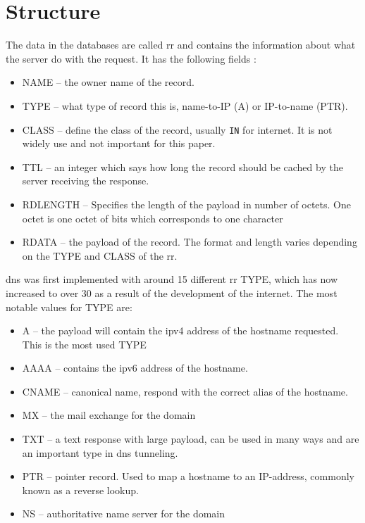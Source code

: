 \section{Structure}
The data in the databases are called \gls{rr} and contains the information about what the server do with the request. It has the following fields \cite{mockapetris1983domain}:
\begin{itemize} 
\item NAME -- the owner name of the record.
\item TYPE -- what type of record this is, name-to-IP (A) or IP-to-name (PTR).
\item CLASS -- define the class of the record, usually \texttt{IN} for internet. It is not widely use and not important for this paper.
\item TTL -- an integer which says how long the record should be cached by the server receiving the response.
\item RDLENGTH -- Specifies the length of the payload in number of octets. One octet is one octet of bits which corresponds to one character
\item RDATA -- the payload of the record. The format and length varies depending on the TYPE and CLASS of the \Gls{rr}.
\end{itemize}

\gls{dns} was first implemented with around 15 different \gls{rr} TYPE, which has now increased to over 30 \cite{farnham2013detecting} as a result of the development of the internet. The most notable values for TYPE are:

\begin{itemize}
\item A -- the payload will contain the ipv4 address of the hostname requested. This is the most used TYPE
\item AAAA -- contains the ipv6 address of the hostname.
\item CNAME -- canonical name, respond with the correct alias of the hostname.
\item MX -- the mail exchange for the domain
\item TXT -- a text response with large payload, can be used in many ways and are an important type in \gls{dns} tunneling.
\item PTR -- pointer record. Used to map a hostname to an IP-address, commonly known as a reverse lookup.
\item NS -- authoritative name server for the domain
\end{itemize}

